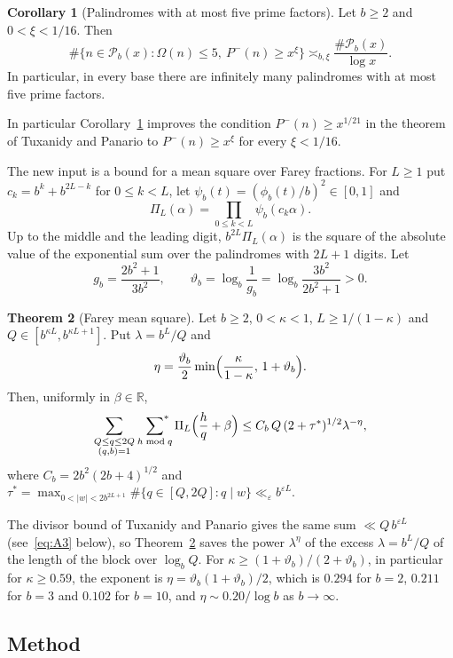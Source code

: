 \documentclass[11pt]{amsart}
\theoremstyle{definition}
\newtheorem{theorem}{Theorem}[section]
\newtheorem{corollary}[theorem]{Corollary}
\numberwithin{equation}{section}
\newcommand{\R}{\mathbb{R}}
\newcommand{\PP}{\mathscr{P}}
\newcommand{\sumstar}{\sideset{}{^*}\sum}
\begin{document}
\begin{corollary}[Palindromes with at most five prime factors]\label{cor:five}
Let $b\ge2$ and $0<\xi<1/16$. Then
\[
\#\{n\in\PP_b(x):\Omega(n)\le5,\ P^-(n)\ge x^{\xi}\}\asymp_{b,\xi}\frac{\#\PP_b(x)}{\log x}.
\]
In particular, in every base there are infinitely many palindromes with at most five prime factors.
\end{corollary}

In particular Corollary~\ref{cor:five} improves the condition $P^-(n)\ge x^{1/21}$ in the theorem of Tuxanidy and Panario to $P^-(n)\ge x^{\xi}$ for every $\xi<1/16$.

The new input is a bound for a mean square over Farey fractions. For $L\ge1$ put $c_k=b^k+b^{2L-k}$ for $0\le k<L$, let $\psi_b(t)=(\phi_b(t)/b)^2\in[0,1]$ and
\[
\Pi_L(\alpha)=\prod_{0\le k<L}\psi_b(c_k\alpha).
\]
Up to the middle and the leading digit, $b^{2L}\Pi_L(\alpha)$ is the square of the absolute value of the exponential sum over the palindromes with $2L+1$ digits. Let
\[
g_b=\frac{2b^2+1}{3b^2},\qquad \vartheta_b=\log_b\frac1{g_b}=\log_b\frac{3b^2}{2b^2+1}>0 .
\]

\begin{theorem}[Farey mean square]\label{thm:V}
Let $b\ge2$, $0<\kappa<1$, $L\ge 1/(1-\kappa)$ and $Q\in[b^{\kappa L},b^{\kappa L+1}]$. Put $\lambda=b^L/Q$ and
\[
\eta=\frac{\vartheta_b}{2}\min\Bigl(\frac{\kappa}{1-\kappa},\,1+\vartheta_b\Bigr).
\]
Then, uniformly in $\beta\in\R$,
\[
\sum_{\substack{Q\le q\le 2Q\\(q,b)=1}}\ \sumstar_{h\bmod q}\Pi_L\Bigl(\frac hq+\beta\Bigr)\le C_b\,Q\,(2+\tau^*)^{1/2}\lambda^{-\eta},
\]
where $C_b=2b^2(2b+4)^{1/2}$ and $\tau^*=\max_{0<|w|<2b^{2L+1}}\#\{q\in[Q,2Q]:q\mid w\}\ll_\varepsilon b^{\varepsilon L}$.
\end{theorem}

The divisor bound of Tuxanidy and Panario \cite[Lemma~8.2]{TP} gives the same sum $\ll Q\,b^{\varepsilon L}$ (see~\eqref{eq:A3} below), so Theorem~\ref{thm:V} saves the power $\lambda^{\eta}$ of the excess $\lambda=b^L/Q$ of the length of the block over $\log_bQ$. For $\kappa\ge(1+\vartheta_b)/(2+\vartheta_b)$, in particular for $\kappa\ge0.59$, the exponent is $\eta=\vartheta_b(1+\vartheta_b)/2$, which is $0.294$ for $b=2$, $0.211$ for $b=3$ and $0.102$ for $b=10$, and $\eta\sim 0.20/\log b$ as $b\to\infty$.

\subsection{Method}
\end{document}
